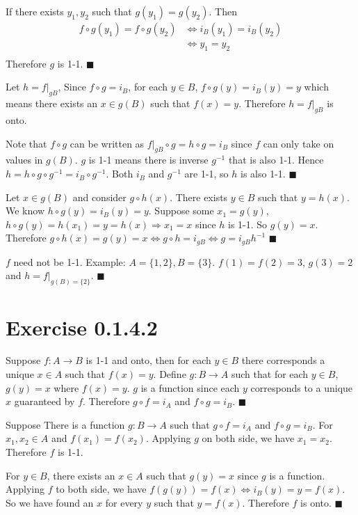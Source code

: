 \documentclass[12pt]{article}
\begin{document}
 If there exists $y_1, y_2$ such that $g(y_1) = g(y_2)$. Then 
$$ \begin{aligned}
	f\circ g(y_1) = f \circ g(y_2) & \Leftrightarrow i_B(y_1) = i_B(y_2)  \\
	 &\Leftrightarrow	y_1 = y_2  \\
\end{aligned}
$$
Therefore $g$ is 1-1.  $\blacksquare$

Let $h = f|_{gB}$, Since $f \circ g = i_B$, for each $y \in B$, $f \circ g (y) = i_B(y) = y$ which means there exists an $x \in g(B)$ such that $f(x) = y$. Therefore $h = f|_{gB}$ is onto. 

Note that $f \circ g$ can be written as $f|_{gB} \circ g = h \circ g = i_B$ since $f$ can only take on values in $g(B)$. $g$ is 1-1 means there is inverse $g^{-1}$ that is also 1-1. Hence $h = h \circ g \circ g^{-1} = i_B \circ g^{-1}$. Both $i_B$ and  $g^{-1}$ are 1-1, so $h$ is also 1-1.  $\blacksquare$

Let $x \in g(B)$ and consider $g \circ h (x)$. There exists $y \in B$ such that $y = h(x)$. We know $h \circ g (y) = i_B(y) = y$. Suppose some $x_1 = g(y)$,  $h \circ g(y) = h(x_1) = y = h(x) \Rightarrow x_1 = x$ since $h$ is 1-1. So $g(y) = x$.  Therefore $g \circ h (x) = g (y) = x \Leftrightarrow g \circ h = i_{gB} \Leftrightarrow g = i_{gB} h^{-1}$  $\blacksquare$

$f$ need not be 1-1. Example: $A = \{1, 2\}, B=\{3\}$. $f(1) = f(2) = 3$, $g(3) = 2$ and $h = f|_{g(B) =\{2\}}$. $\blacksquare$

\section*{Exercise 0.1.4.2}
Suppose $f: A \rightarrow B$ is 1-1 and onto, then for each $y \in B$ there corresponds a unique $x \in A$ such that $f(x) = y$.  Define $g: B \rightarrow A$ such that for each $y \in B$, $g(y) = x$ where $f(x) =y$. $g$ is a function since each $y$ corresponds to a unique $x$ guaranteed by $f$. Therefore $g\circ f = i_A$ and $f \circ g = i_B$. $\blacksquare$

Suppose There is a function $g : B \rightarrow A$ such that $g \circ f = i_A$ and $f \circ g = i_B$. For $x_1, x_2 \in A$ and $f(x_1) = f(x_2)$. Applying $g$ on both side, we have $x_1 = x_2$. Therefore $f$ is 1-1. 

For $y \in B$, there exists an $x \in A$ such that $g(y) = x$ since $g$ is a function. Applying $f$ to both side, we have $f(g(y)) = f(x) \Leftrightarrow i_B(y) = y = f(x)$. So we have found an $x$ for every $y$ such that $y = f(x)$.  Therefore $f$ is onto.  $\blacksquare$
\end{document}
